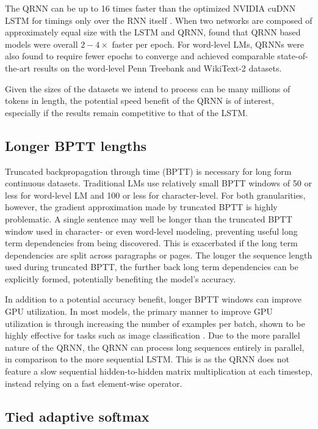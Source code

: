 \documentclass{article}
\begin{document}
The QRNN can be up to 16 times faster than the optimized NVIDIA cuDNN LSTM for timings only over the RNN itself \citep{Bradbury2016}.
When two networks are composed of approximately equal size with the LSTM and QRNN, \cite{merity2018regularizing} found that QRNN based models were overall $2-4\times$ faster per epoch.
For word-level LMs, QRNNs were also found to require fewer epochs to converge and achieved comparable state-of-the-art results on the word-level Penn Treebank and WikiText-2 datasets.

Given the sizes of the datasets we intend to process can be many millions of tokens in length, the potential speed benefit of the QRNN is of interest, especially if the results remain competitive to that of the LSTM.

\subsection{Longer BPTT lengths}

Truncated backpropagation through time (BPTT) \citep{williams1990efficient,werbos1990backpropagation} is necessary for long form continuous datasets.
Traditional LMs use relatively small BPTT windows of 50 or less for word-level LM and 100 or less for character-level.
For both granularities, however, the gradient approximation made by truncated BPTT is highly problematic.
A single sentence may well be longer than the truncated BPTT window used in character- or even word-level modeling, preventing useful long term dependencies from being discovered.
This is exacerbated if the long term dependencies are split across paragraphs or pages.
The longer the sequence length used during truncated BPTT, the further back long term dependencies can be explicitly formed, potentially benefiting the model's accuracy.

In addition to a potential accuracy benefit, longer BPTT windows can improve GPU utilization.
In most models, the primary manner to improve GPU utilization is through increasing the number of examples per batch, shown to be highly effective for tasks such as image classification \citep{goyal2017accurate}.
Due to the more parallel nature of the QRNN, the QRNN can process long sequences entirely in parallel, in comparison to the more sequential LSTM.
This is as the QRNN does not feature a slow sequential hidden-to-hidden matrix multiplication at each timestep, instead relying on a fast element-wise operator.

\subsection{Tied adaptive softmax}
\end{document}
